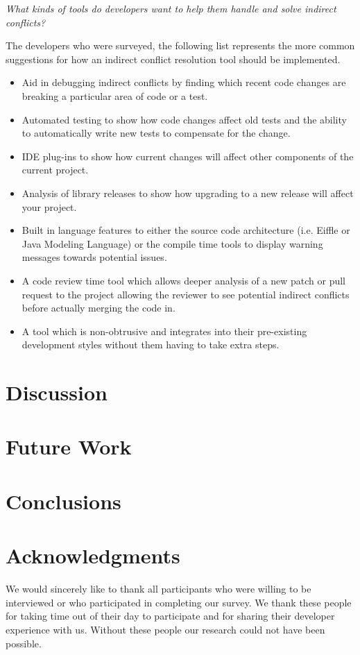 \documentclass[conference]{IEEEtran}
\begin{document}
\begin{description}[topsep=6pt]
	\item[RQ7] \textit{What kinds of tools do developers want to help them handle and solve indirect conflicts?}
\end{description}

The developers who were surveyed, the following list represents the more common suggestions for how an indirect conflict
resolution tool should be implemented.

\begin{itemize}
	\item Aid in debugging indirect conflicts by finding which recent code changes are breaking a particular area of code or a test.
	\item Automated testing to show how code changes affect old tests and the ability to automatically write new tests to compensate for the change.
	\item IDE plug-ins to show how current changes will affect other components of the current project.
	\item Analysis of library releases to show how upgrading to a new release will affect your project.
	\item Built in language features to either the source code architecture (i.e. Eiffle or Java Modeling Language) or the compile time tools to display
				warning messages towards potential issues.
	\item A code review time tool which allows deeper analysis of a new patch or pull request to the project allowing the reviewer to see potential 
				indirect conflicts before actually merging the code in.
	\item A tool which is non-obtrusive and integrates into their pre-existing development styles without them having to take extra steps.
\end{itemize}

\section{Discussion}

\section{Future Work}

\section{Conclusions}

\section{Acknowledgments}

We would sincerely like to thank all participants who were willing to be interviewed or who participated
in completing our survey. We thank these people for taking time out of their day to participate and for
sharing their developer experience with us. Without these people our research could not have been possible.

%
%

\end{document}
